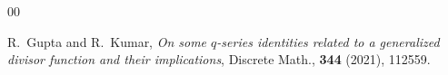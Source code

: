 \documentclass[11pt,reqno]{amsart}
\renewcommand{\(}{\left\(}
\renewcommand{\)}{\right\)}
\renewcommand{\[}{\left\[}
\renewcommand{\]}{\right\]}
\numberwithin{equation}{section}
\theoremstyle{plain}
\begin{document}
\begin{thebibliography}{00}

 
 
 
 
 
% 

 

 
  R.~Gupta and R.~Kumar,  \emph{On some $q$-series identities related to a generalized divisor function and their implications},  Discrete Math., {\bf 344} (2021),  112559.  
 

\end{thebibliography}
\end{document}
